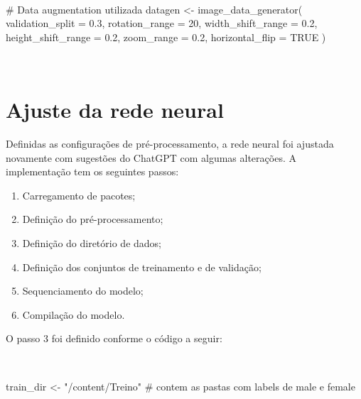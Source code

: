 \documentclass[
  a4paperpaper,
]{article}
\newenvironment{Shaded}{\begin{snugshade}}{\end{snugshade}}
\newcommand{\AttributeTok}[1]{\textcolor[rgb]{0.40,0.45,0.13}{#1}}
\newcommand{\CommentTok}[1]{\textcolor[rgb]{0.37,0.37,0.37}{#1}}
\newcommand{\ConstantTok}[1]{\textcolor[rgb]{0.56,0.35,0.01}{#1}}
\newcommand{\DecValTok}[1]{\textcolor[rgb]{0.68,0.00,0.00}{#1}}
\newcommand{\FloatTok}[1]{\textcolor[rgb]{0.68,0.00,0.00}{#1}}
\newcommand{\FunctionTok}[1]{\textcolor[rgb]{0.28,0.35,0.67}{#1}}
\newcommand{\NormalTok}[1]{\textcolor[rgb]{0.00,0.23,0.31}{#1}}
\newcommand{\OtherTok}[1]{\textcolor[rgb]{0.00,0.23,0.31}{#1}}
\newcommand{\StringTok}[1]{\textcolor[rgb]{0.13,0.47,0.30}{#1}}
\providecommand{\tightlist}{%
  \setlength{\itemsep}{0pt}\setlength{\parskip}{0pt}}\usepackage{longtable,booktabs,array}
\begin{document}
~

\begin{Shaded}
\begin{Highlighting}[]
\CommentTok{\# Data augmentation utilizada}
\NormalTok{datagen }\OtherTok{\textless{}{-}} \FunctionTok{image\_data\_generator}\NormalTok{(}
  \AttributeTok{validation\_split =} \FloatTok{0.3}\NormalTok{,}
  \AttributeTok{rotation\_range =} \DecValTok{20}\NormalTok{,}
  \AttributeTok{width\_shift\_range =} \FloatTok{0.2}\NormalTok{,}
  \AttributeTok{height\_shift\_range =} \FloatTok{0.2}\NormalTok{,}
  \AttributeTok{zoom\_range =} \FloatTok{0.2}\NormalTok{,}
  \AttributeTok{horizontal\_flip =} \ConstantTok{TRUE}
\NormalTok{)}
\end{Highlighting}
\end{Shaded}

~

\section{Ajuste da rede neural}\label{ajuste-da-rede-neural}

Definidas as configurações de pré-processamento, a rede neural foi
ajustada novamente com sugestões do ChatGPT com algumas alterações. A
implementação tem os seguintes passos:

\begin{enumerate}
\def\labelenumi{\arabic{enumi}.}
\tightlist
\item
  Carregamento de pacotes;
\item
  Definição do pré-processamento;
\item
  Definição do diretório de dados;
\item
  Definição dos conjuntos de treinamento e de validação;
\item
  Sequenciamento do modelo;
\item
  Compilação do modelo.
\end{enumerate}

O passo 3 foi definido conforme o código a seguir:

~

\begin{Shaded}
\begin{Highlighting}[]
\NormalTok{train\_dir }\OtherTok{\textless{}{-}} \StringTok{"/content/Treino"}
\CommentTok{\# contem as pastas com labels de male e female}
\end{Highlighting}
\end{Shaded}

~
\end{document}
